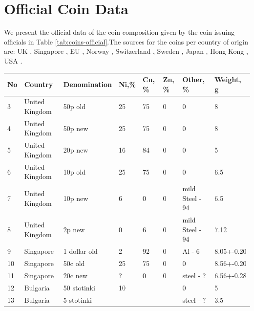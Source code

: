 \documentclass[11pt,a4paper,twoside,onecolumn]{article}
\begin{document}
\section{Official Coin Data}
We present the official data of the coin composition given by the coin issuing officials in Table \ref{tab:coins-official}.The sources for the coins per country of origin are: UK \cite{RoyalMint}, Singapore \cite{SingaporeOld,SingaporeNew}, EU \cite{2014EUCoins}, Norway \cite{1997NorwayKrone}, Switzerland \cite{SwissCentime}, Sweden \cite{SwedenKrona}, Japan \cite{JapanYen}, Hong Kong \cite{HongKongCent}, USA \cite{USACoins}.

\begin{table}[htbp]
    \centering
    \begin{tabular}{@{}llllllll@{}}
        \toprule
        No & Country        & Denomination   & Ni,\%    & Cu, \%   & Zn, \% & Other, \%            & Weight, g  \\ \midrule
        3  & United Kingdom & 50p old        & 25       & 75       & 0      & 0                    & 8          \\
        4  & United Kingdom & 50p new        & 25       & 75       & 0      & 0                    & 8          \\
        5  & United Kingdom & 20p new        & 16       & 84       & 0      & 0                    & 5          \\
        6  & United Kingdom & 10p old        & 25       & 75       & 0      & 0                    & 6.5        \\
        7  & United Kingdom & 10p new        & 6        & 0        & 0      & mild Steel - 94      & 6.5        \\
        8  & United Kingdom & 2p new         & 0        & 6        & 0      & mild Steel - 94      & 7.12        \\
        9  & Singapore      & 1 dollar old   & 2        & 92       & 0      & Al - 6               & 8.05+-0.20 \\
        10 & Singapore      & 50c old        & 25       & 75       & 0      & 0                    & 8.56+-0.20 \\
        11 & Singapore      & 20c new        & ?        & 0        & 0      & steel - ?            & 6.56+-0.28 \\
        12 & Bulgaria       & 50 stotinki    & 10       &          &        & 0                    & 5          \\
        13 & Bulgaria       & 5 stotinki     &          &          &        & steel - ?            & 3.5        \\

\end{tabular}
\end{table}
\end{document}
